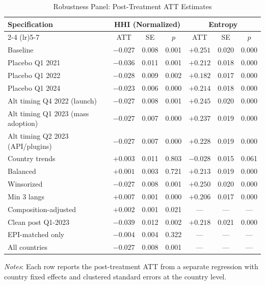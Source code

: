 \begin{table}[H]
\centering
\begin{threeparttable}
\caption{Robustness Panel: Post-Treatment ATT Estimates}
\label{tab:robustness}
\small
\begin{tabular}{lcccccc}
\toprule
Specification & \multicolumn{3}{c}{HHI (Normalized)} & \multicolumn{3}{c}{Entropy} \\
\cmidrule(lr){2-4} \cmidrule(lr){5-7}
 & ATT & SE & $p$ & ATT & SE & $p$ \\
\midrule
Baseline & $-0.027$ & 0.008 & 0.001 & $+0.251$ & 0.020 & 0.000 \\
Placebo Q1 2021 & $-0.036$ & 0.011 & 0.001 & $+0.212$ & 0.018 & 0.000 \\
Placebo Q1 2022 & $-0.028$ & 0.009 & 0.002 & $+0.182$ & 0.017 & 0.000 \\
Placebo Q1 2024 & $-0.023$ & 0.006 & 0.000 & $+0.214$ & 0.018 & 0.000 \\
Alt timing Q4 2022 (launch) & $-0.027$ & 0.008 & 0.001 & $+0.245$ & 0.020 & 0.000 \\
Alt timing Q1 2023 (mass adoption) & $-0.027$ & 0.007 & 0.000 & $+0.237$ & 0.019 & 0.000 \\
Alt timing Q2 2023 (API/plugins) & $-0.027$ & 0.007 & 0.000 & $+0.228$ & 0.019 & 0.000 \\
Country trends & $+0.003$ & 0.011 & 0.803 & $-0.028$ & 0.015 & 0.061 \\
Balanced & $+0.001$ & 0.003 & 0.721 & $+0.213$ & 0.019 & 0.000 \\
Winsorized & $-0.027$ & 0.008 & 0.001 & $+0.250$ & 0.020 & 0.000 \\
Min 3 langs & $+0.007$ & 0.001 & 0.000 & $+0.206$ & 0.017 & 0.000 \\
Composition-adjusted & $+0.002$ & 0.001 & 0.021 & --- & --- & --- \\
Clean post Q1-2023 & $-0.039$ & 0.012 & 0.002 & $+0.218$ & 0.021 & 0.000 \\
EPI-matched only & $-0.004$ & 0.004 & 0.322 & --- & --- & --- \\
All countries & $-0.027$ & 0.008 & 0.001 & --- & --- & --- \\
\bottomrule
\end{tabular}
\begin{tablenotes}
\small
\item \textit{Notes}: Each row reports the post-treatment ATT from a separate regression
with country fixed effects and clustered standard errors at the country level.
\end{tablenotes}
\end{threeparttable}
\end{table}
